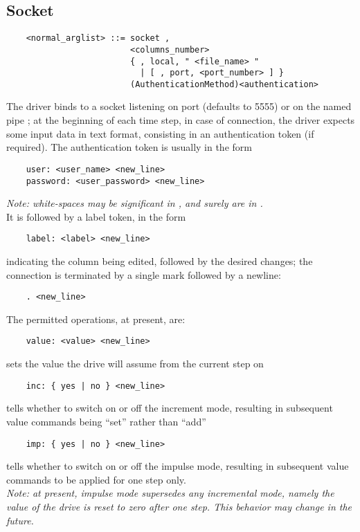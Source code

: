 \subsection{Socket}
\begin{verbatim}
    <normal_arglist> ::= socket , 
                         <columns_number>
                         { , local, " <file_name> " 
                           | [ , port, <port_number> ] }
                         (AuthenticationMethod)<authentication>
\end{verbatim}
The driver binds to a socket listening on port  
(defaults to 5555) or on the named pipe ; at the
beginning of each time step, in case of connection, the driver expects some
input data in text format, consisting in an authentication token 
(if required).
The authentication token is usually in the form
\begin{verbatim}
    user: <user_name> <new_line>
    password: <user_password> <new_line>
\end{verbatim}
{\em 
    Note: white-spaces may be significant in , 
    and surely are in .
} \\    
It is followed by a label token, in the form
\begin{verbatim}
    label: <label> <new_line>
\end{verbatim}
indicating the column being edited, followed by the desired changes; 
the connection is terminated by a single mark followed by a newline:
\begin{verbatim}
    . <new_line>
\end{verbatim}
The permitted operations, at present, are:
\begin{verbatim}
    value: <value> <new_line>
\end{verbatim}
sets the value the drive will assume from the current step on
\begin{verbatim}
    inc: { yes | no } <new_line>
\end{verbatim}
tells whether to switch on or off the increment mode, resulting in
subsequent value commands being ``set'' rather than ``add''
\begin{verbatim}
    imp: { yes | no } <new_line>
\end{verbatim}
tells whether to switch on or off the impulse mode, resulting in subsequent
value commands to be applied for one step only. \\
{\em 
    Note: at present, impulse mode supersedes any incremental mode, namely
    the value of the drive is reset to zero after one step.
    This behavior may change in the future.
}



